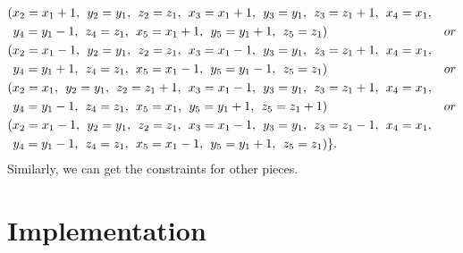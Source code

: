 \begin{align*}
&(x_{2}=x_{1}+1,\hspace{1ex} y_{2}=y_{1},\hspace{1ex} z_{2}=z_{1},\hspace{1ex} x_{3}=x_{1}+1,\hspace{1ex} y_{3}=y_{1},\hspace{1ex} z_{3}=z_{1}+1,\hspace{1ex} x_{4}=x_{1},\\
&\hspace{1ex} y_{4}=y_{1}-1,\hspace{1ex} z_{4}=z_{1},\hspace{1ex} x_{5}=x_{1}+1,\hspace{1ex} y_{5}=y_{1}+1,\hspace{1ex} z_{5}=z_{1})&or\\ 
&(x_{2}=x_{1}-1,\hspace{1ex} y_{2}=y_{1},\hspace{1ex} z_{2}=z_{1},\hspace{1ex} x_{3}=x_{1}-1,\hspace{1ex} y_{3}=y_{1},\hspace{1ex} z_{3}=z_{1}+1,\hspace{1ex} x_{4}=x_{1},\\
&\hspace{1ex} y_{4}=y_{1}+1,\hspace{1ex} z_{4}=z_{1},\hspace{1ex} x_{5}=x_{1}-1,\hspace{1ex} y_{5}=y_{1}-1,\hspace{1ex} z_{5}=z_{1})&or\\ 
&(x_{2}=x_{1},\hspace{1ex} y_{2}=y_{1},\hspace{1ex} z_{2}=z_{1}+1,\hspace{1ex} x_{3}=x_{1}-1,\hspace{1ex} y_{3}=y_{1},\hspace{1ex} z_{3}=z_{1}+1,\hspace{1ex} x_{4}=x_{1},\\
&\hspace{1ex} y_{4}=y_{1}-1,\hspace{1ex} z_{4}=z_{1},\hspace{1ex} x_{5}=x_{1},\hspace{1ex} y_{5}=y_{1}+1,\hspace{1ex} z_{5}=z_{1}+1)&or\\ 
&(x_{2}=x_{1}-1,\hspace{1ex} y_{2}=y_{1},\hspace{1ex} z_{2}=z_{1},\hspace{1ex} x_{3}=x_{1}-1,\hspace{1ex} y_{3}=y_{1},\hspace{1ex} z_{3}=z_{1}-1,\hspace{1ex} x_{4}=x_{1},\\
&\hspace{1ex} y_{4}=y_{1}-1,\hspace{1ex} z_{4}=z_{1},\hspace{1ex} x_{5}=x_{1}-1,\hspace{1ex} y_{5}=y_{1}+1,\hspace{1ex} z_{5}=z_{1})\}.
\end{align*}
Similarly, we can get the constraints for other pieces.
\section{Implementation}